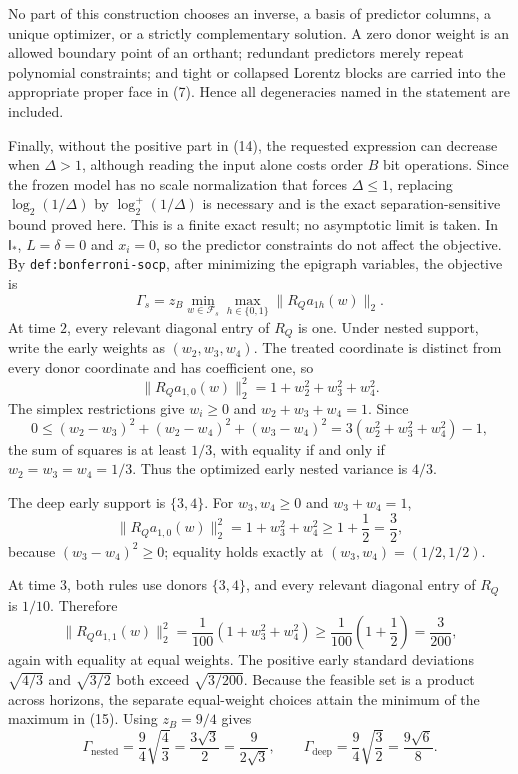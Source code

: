 No part of this construction chooses an inverse, a basis of predictor columns,
a unique optimizer, or a strictly complementary solution.  A zero donor
weight is an allowed boundary point of an orthant; redundant predictors merely
repeat polynomial constraints; and tight or collapsed Lorentz blocks are
carried into the appropriate proper face in (7).  Hence all degeneracies named
in the statement are included.

Finally, without the positive part in (14), the requested expression can
decrease when \(\Delta>1\), although reading the input alone costs order
\(B\) bit operations.  Since the frozen model has no scale normalization that
forces \(\Delta\le1\), replacing \(\log_2(1/\Delta)\) by
\(\log_2^+(1/\Delta)\) is necessary and is the exact separation-sensitive
bound proved here.  This is a finite exact result; no asymptotic limit is
taken.
In \(\mathsf I_*\), \(L=\delta=0\) and \(x_i=0\), so the predictor constraints
do not affect the objective.  By \texttt{def:bonferroni-socp}, after minimizing
the epigraph variables, the objective is
\[
 \Gamma_s=z_B\min_{w\in\mathcal F_s}
 \max_{h\in\{0,1\}}\|R_Qa_{1h}(w)\|_2. \tag{15}
\]
At time \(2\), every relevant diagonal entry of \(R_Q\) is one.  Under nested
support, write the early weights as \((w_2,w_3,w_4)\).  The treated coordinate
is distinct from every donor coordinate and has coefficient one, so
\[
 \|R_Qa_{1,0}(w)\|_2^2
 =1+w_2^2+w_3^2+w_4^2. \tag{16}
\]
The simplex restrictions give \(w_i\ge0\) and
\(w_2+w_3+w_4=1\).  Since
\[
 0\le (w_2-w_3)^2+(w_2-w_4)^2+(w_3-w_4)^2
 =3(w_2^2+w_3^2+w_4^2)-1,
\]
the sum of squares is at least \(1/3\), with equality if and only if
\(w_2=w_3=w_4=1/3\).  Thus the optimized early nested variance is \(4/3\).

The deep early support is \(\{3,4\}\).  For
\(w_3,w_4\ge0\) and \(w_3+w_4=1\),
\[
 \|R_Qa_{1,0}(w)\|_2^2=1+w_3^2+w_4^2
 \ge1+\frac12=\frac32, \tag{17}
\]
because \((w_3-w_4)^2\ge0\); equality holds exactly at
\((w_3,w_4)=(1/2,1/2)\).

At time \(3\), both rules use donors \(\{3,4\}\), and every relevant diagonal
entry of \(R_Q\) is \(1/10\).  Therefore
\[
 \|R_Qa_{1,1}(w)\|_2^2
 =\frac1{100}(1+w_3^2+w_4^2)
 \ge\frac1{100}\left(1+\frac12\right)=\frac3{200}, \tag{18}
\]
again with equality at equal weights.  The positive early standard deviations
\(\sqrt{4/3}\) and \(\sqrt{3/2}\) both exceed
\(\sqrt{3/200}\).  Because the feasible set is a product across horizons,
the separate equal-weight choices attain the minimum of the maximum in (15).
Using \(z_B=9/4\) gives
\[
 \Gamma_{\mathrm{nested}}
 =\frac94\sqrt{\frac43}
 =\frac{3\sqrt3}{2}
 =\frac9{2\sqrt3},
 \qquad
 \Gamma_{\mathrm{deep}}
 =\frac94\sqrt{\frac32}
 =\frac{9\sqrt6}{8}. \tag{19}
\]

